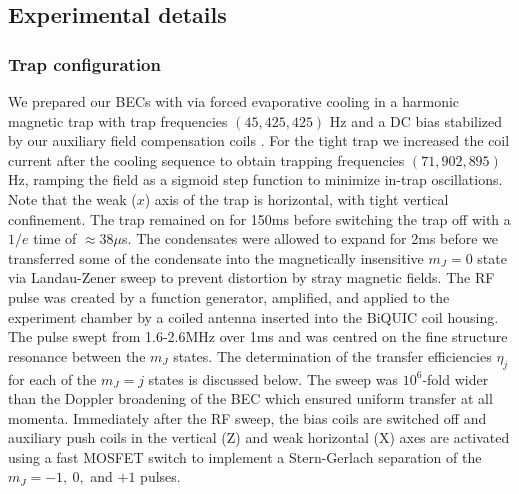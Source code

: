 	
	


\subsection{Experimental details}
\label{sec:exp_details}
\subsubsection{Trap configuration}

	We prepared our BECs with via forced evaporative cooling in a harmonic magnetic trap with trap frequencies $(45,425,425)$ Hz and a DC bias stabilized by our auxiliary field compensation coils \cite{Dall07,Dedman07}. For the tight trap we increased the coil current after the cooling sequence to obtain trapping frequencies $(71,902,895)$ Hz, ramping the field as a sigmoid step function to minimize in-trap oscillations. Note that the weak ($x$) axis of the trap is horizontal, with tight vertical confinement. The trap remained on for 150ms before switching the trap off with a $1/e$ time of $\approx38\mu$s. The condensates were allowed to expand for 2ms before we transferred some of the condensate into the magnetically insensitive $m_J=0$ state via Landau-Zener sweep to prevent distortion by stray magnetic fields. The RF pulse was created by a  function generator, amplified, and applied to the experiment chamber by a coiled antenna inserted into the BiQUIC coil housing. The pulse swept from 1.6-2.6MHz over 1ms and was centred on the fine structure resonance between the $m_J$ states. The determination of the transfer efficiencies $\eta_j$ for each of the $m_J = j$ states is discussed below. The sweep was $10^6$-fold wider than the Doppler broadening of the BEC which ensured uniform transfer at all momenta. Immediately after the RF sweep, the bias coils are switched off and auxiliary push coils in the vertical (Z) and weak horizontal (X) axes are activated using a fast MOSFET switch to implement a Stern-Gerlach separation of the $m_J = -1,~0,$ and $+1$ pulses.

